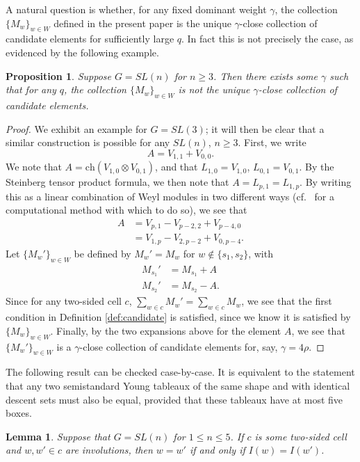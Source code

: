 \documentclass{amsart}
\newtheorem{lemma}[thm]{Lemma}
\newtheorem{prop}[thm]{Proposition}
\theoremstyle{definition}
\begin{document}
A natural question is whether, for any fixed dominant weight $\gamma$, the collection $\{M_w\}_{w \in W}$ defined in the present paper is the unique $\gamma$-close collection of candidate elements for sufficiently large $q$. In fact this is not precisely the case, as evidenced by the following example.
\begin{prop}
    Suppose $G = SL(n)$ for $n \geq 3$. Then there exists some $\gamma$ such that for any $q$, the collection $\{M_w\}_{w \in W}$ is not the unique $\gamma$-close collection of candidate elements.
\end{prop}
\begin{proof}
    We exhibit an example for $G = SL(3)$; it will then be clear that a similar construction is possible for any $SL(n)$, $n \geq 3$. First, we write 
    \[A = V_{1,1} + V_{0,0}.\]
    We note that $A = \mathrm{ch}(V_{1,0} \otimes V_{0,1})$, and that $L_{1,0} = V_{1,0}$, $L_{0,1} = V_{0,1}$. By the Steinberg tensor product formula, we then note that $A = L_{p,1} = L_{1,p}$. By writing this as a linear combination of Weyl modules in two different ways (cf.\ \cite{dynkin} for a computational method with which to do so), we see that
    \begin{align}
        A & = V_{p,1} - V_{p-2,2} + V_{p-4,0}\\
        & = V_{1,p} - V_{2,p-2} + V_{0,p-4}.
    \end{align}
    Let $\{M_w'\}_{w \in W}$ be defined by $M_w' = M_w$ for $w \notin \{s_1, s_2\}$, with
    \begin{align}
        M_{s_1}' & = M_{s_1} + A\\
        M_{s_2}' & = M_{s_2} - A.
    \end{align}
    Since for any two-sided cell $c$, $\sum_{w \in c} M_w' = \sum_{w \in c} M_w$, we see that the first condition in Definition \ref{def:candidate} is satisfied, since we know it is satisfied by $\{M_w\}_{w \in W}$. Finally, by the two expansions above for the element $A$, we see that $\{M_w'\}_{w \in W}$ is a $\gamma$-close collection of candidate elements for, say, $\gamma = 4\rho$. 
\end{proof}

The following result can be checked case-by-case. It is equivalent to the statement that any two semistandard Young tableaux of the same shape and with identical descent sets must also be equal, provided that these tableaux have at most five boxes.
\begin{lemma}\label{lem:tableau}
    Suppose that $G = SL(n)$ for $1 \leq n \leq 5$. If $c$ is some two-sided cell and $w, w' \in c$ are involutions, then $w = w'$ if and only if $I(w) = I(w')$.
\end{lemma}
\end{document}
